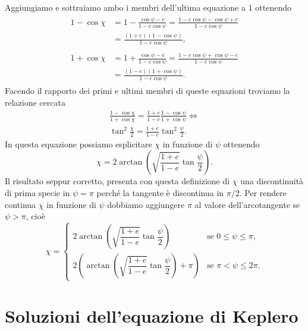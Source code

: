 Aggiungiamo e sottraiamo ambo i membri dell'ultima equazione a $1$ ottenendo
\begin{align}
  \begin{split}
    1-\cos\chi &= 1-\frac{\cos\psi-e}{1-e\cos\psi} =
    \frac{1-e\cos\psi-\cos\psi+e}{1-e\cos\psi} \\
    &= \frac{(1+e)(1-\cos\psi)}{1-e\cos\psi},
  \end{split} \\
  \begin{split}
    1+\cos\chi &= 1+\frac{\cos\psi-e}{1-e\cos\psi} =
    \frac{1-e\cos\psi+\cos\psi-e}{1-e\cos\psi} \\
    &= \frac{(1-e)(1+\cos\psi)}{1-e\cos\psi}.
  \end{split}
\end{align}
Facendo il rapporto dei primi e ultimi membri di queste equazioni troviamo
la relazione cercata
\begin{gather}
  \frac{1-\cos\chi}{1+\cos\chi} = \frac{1+e}{1-e}\frac{1-\cos\psi}{1+\cos\psi}
  \iff \\
  \tan^2\frac{\chi}{2} = \frac{1+e}{1-e}\tan^2\frac{\psi}{2}.
\end{gather}
In questa equazione possiamo esplicitare $\chi$ in funzione di $\psi$ ottenendo
\begin{equation}
  \chi = 2\arctan
  \left(
    \sqrt{\frac{1+e}{1-e}}\tan\frac{\psi}{2}
  \right).
\end{equation}
Il risultato seppur corretto, presenta con questa definizione di $\chi$ una
discontinuità di prima specie in $\psi = \pi$ perché la tangente è discontinua
in $\pi/2$. Per rendere continua $\chi$ in funzione di $\psi$ dobbiamo
aggiungere $\pi$ al valore dell'arcotangente se $\psi > \pi$, cioè
\begin{equation}
  \label{eq:anoamlie-vera-eccentrica}
  \chi =
  \begin{cases}
    2\arctan
  \left(
    \sqrt{\dfrac{1+e}{1-e}}\tan\dfrac{\psi}{2}
  \right) & \text{se $0 \leq \psi \leq \pi$,}
    \\[2.0ex]
  2
  \left(
    \arctan
    \left(
      \sqrt{\dfrac{1+e}{1-e}}\tan\dfrac{\psi}{2}
    \right) + \pi
  \right) & \text{se $\pi < \psi \leq 2\pi$.}
  \end{cases}
\end{equation}

\section{Soluzioni dell'equazione di Keplero}
\label{sec:soluzioni}

